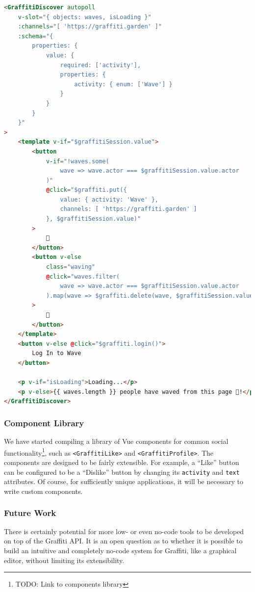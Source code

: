 \begin{lstlisting}[language=html]
<GraffitiDiscover autopoll
    v-slot="{ objects: waves, isLoading }"
    :channels="[ 'https://graffiti.garden' ]"
    :schema="{
        properties: {
            value: {
                required: ['activity'],
                properties: {
                    activity: { enum: ['Wave'] }
                }
            }
        }
    }"
>
    <template v-if="$graffitiSession.value">
        <button
            v-if="!waves.some(
                wave => wave.actor === $graffitiSession.value.actor
            )"
            @click="$graffiti.put({
                value: { activity: 'Wave' },
                channels: [ 'https://graffiti.garden' ]
            }, $graffitiSession.value)"
        >
            👋
        </button>
        <button v-else
            class="waving"
            @click="waves.filter(
                wave => wave.actor === $graffitiSession.value.actor
            ).map(wave => $graffiti.delete(wave, $graffitiSession.value))"
        >
            👋
        </button>
    </template>
    <button v-else @click="$graffiti.login()">
        Log In to Wave
    </button>

    <p v-if="isLoading">Loading...</p>
    <p v-else>{{ waves.length }} people have waved from this page 👋!</p>
</GraffitiDiscover>
\end{lstlisting}

\subsubsection{Component Library}

We have started compiling a library of Vue components
for common social functionality\footnote{
    TODO: Link to components library
},
such as \texttt{<GraffitiLike>} and \texttt{<GraffitiProfile>}.
The components are designed to be fairly extensible.
For example, a ``Like'' button can be configured to be a
``Dislike'' button by changing its \texttt{activity} and
\texttt{text} attributes.
Of course, for sufficiently unique applications, it will be necessary to
write custom components.

\subsubsection{Future Work}

There is certainly potential for more low- or even no-code tools
to be developed on top of the Graffiti API. It is an open
question as to whether it is possible to build an intuitive and completely
no-code system for Graffiti, like a graphical editor, without limiting
its extensibility.

